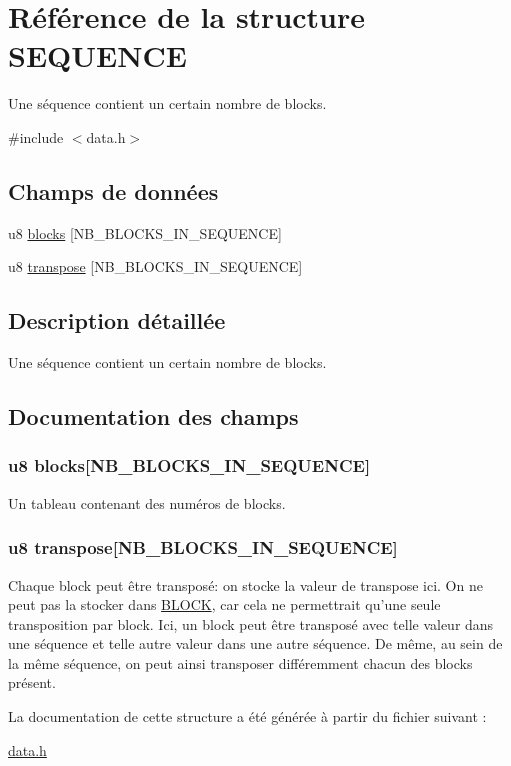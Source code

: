 \hypertarget{struct_s_e_q_u_e_n_c_e}{
\section{Référence de la structure SEQUENCE}
\label{struct_s_e_q_u_e_n_c_e}
}


Une séquence contient un certain nombre de blocks.  




{\ttfamily \#include $<$data.h$>$}

\subsection*{Champs de données}
\begin{DoxyCompactItemize}
\item 
u8 \hyperlink{struct_s_e_q_u_e_n_c_e_a3fdcd2dd1a30726b67f6e843572fc843}{blocks} \mbox{[}NB\_\-BLOCKS\_\-IN\_\-SEQUENCE\mbox{]}
\item 
u8 \hyperlink{struct_s_e_q_u_e_n_c_e_a1a1289316feaf01165a558425cd0eb0e}{transpose} \mbox{[}NB\_\-BLOCKS\_\-IN\_\-SEQUENCE\mbox{]}
\end{DoxyCompactItemize}


\subsection{Description détaillée}
Une séquence contient un certain nombre de blocks. 

\subsection{Documentation des champs}
\hypertarget{struct_s_e_q_u_e_n_c_e_a3fdcd2dd1a30726b67f6e843572fc843}{
\subsubsection[{blocks}]{\setlength{\rightskip}{0pt plus 5cm}u8 {\bf blocks}\mbox{[}NB\_\-BLOCKS\_\-IN\_\-SEQUENCE\mbox{]}}}
\label{struct_s_e_q_u_e_n_c_e_a3fdcd2dd1a30726b67f6e843572fc843}
Un tableau contenant des numéros de blocks. \hypertarget{struct_s_e_q_u_e_n_c_e_a1a1289316feaf01165a558425cd0eb0e}{
\subsubsection[{transpose}]{\setlength{\rightskip}{0pt plus 5cm}u8 {\bf transpose}\mbox{[}NB\_\-BLOCKS\_\-IN\_\-SEQUENCE\mbox{]}}}
\label{struct_s_e_q_u_e_n_c_e_a1a1289316feaf01165a558425cd0eb0e}
Chaque block peut être transposé: on stocke la valeur de transpose ici. On ne peut pas la stocker dans \hyperlink{struct_b_l_o_c_k}{BLOCK}, car cela ne permettrait qu'une seule transposition par block. Ici, un block peut être transposé avec telle valeur dans une séquence et telle autre valeur dans une autre séquence. De même, au sein de la même séquence, on peut ainsi transposer différemment chacun des blocks présent. 

La documentation de cette structure a été générée à partir du fichier suivant :\begin{DoxyCompactItemize}
\item 
\hyperlink{data_8h}{data.h}\end{DoxyCompactItemize}
